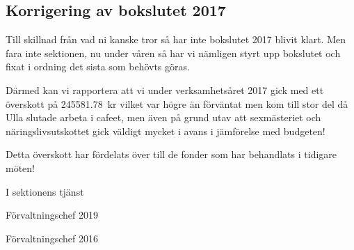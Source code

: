 \documentclass[../_main/handlingar.tex]{subfiles}
\begin{document}
\subsection{Korrigering av bokslutet 2017}

Till skillnad från vad ni kanske tror så har inte bokslutet 2017 blivit klart. Men fara inte sektionen, nu under våren så har vi nämligen styrt upp bokslutet och fixat i ordning det sista som behövts göras.

Därmed kan vi rapportera att vi under verksamhetsåret 2017 gick med ett överskott på \SI{245 581,78}{kr} vilket var högre än förväntat men kom till stor del då Ulla slutade arbeta i cafeet, men även på grund utav att sexmästeriet och näringslivsutskottet gick väldigt mycket i avans i jämförelse med budgeten! 

Detta överskott har fördelats över till de fonder som har behandlats i tidigare möten!


\begin{signatures}{2}
    I sektionens tjänst 
    \signature{\fvc}{Förvaltningschef 2019}
    \signature{Anders Nilsson}{Förvaltningschef 2016}
\end{signatures}
\end{document}
